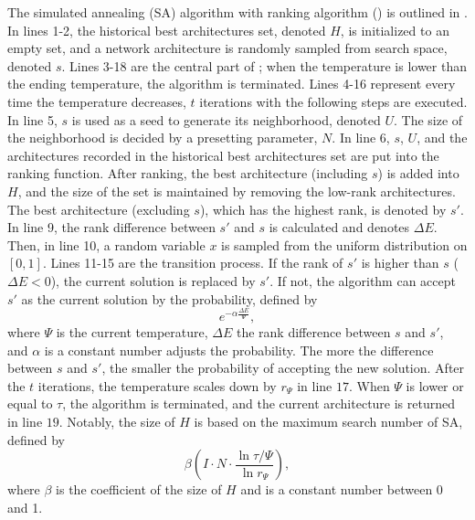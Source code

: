 \documentclass[sigconf]{acmart}
\begin{document}
    The simulated annealing (SA) algorithm with ranking algorithm (\palg{})
    is outlined in . In lines 1-2, the historical best architectures 
    set, denoted $H$, is initialized to an empty set, and a network architecture is randomly sampled from 
    search space, denoted $s$. Lines 3-18 are the central part of \palg{}; when the temperature 
    is lower than the ending temperature, the algorithm is terminated. Lines 4-16 
    represent every time the temperature decreases, $t$ iterations with the following steps are executed. 
    In line 5, $s$ is used as a seed to generate its neighborhood, denoted $U$. 
    The size of the neighborhood is decided by a presetting parameter, $N$. 
    In line 6, $s$, $U$, and the architectures recorded in the historical best architectures set are 
    put into the ranking function. 
    After ranking, the best architecture (including $s$) is added into $H$, and the size of the set is 
    maintained by removing the low-rank architectures. 
    The best architecture (excluding $s$), which has the highest rank, is denoted by $s'$. 
    In line 9, the rank difference between $s'$ and $s$ is calculated and denotes $\Delta E$. 
    Then, in line 10, a random variable $x$ is sampled from the uniform distribution on $[0,1]$. 
    Lines 11-15 are the transition process. If the rank of $s'$ is higher than $s$ ($\Delta E<0$), 
    the current solution is replaced by $s'$. If not, the algorithm can accept $s'$ as the 
    current solution by the probability, defined by 
    \begin{equation} 
        \label{equ:SA_rk_prob}
        e^{-\alpha\frac{\Delta E}{\Psi}}, 
    \end{equation}
    where $\Psi$ is the current temperature, $\Delta E$ the rank difference between 
    $s$ and $s'$, and $\alpha$ is a constant number adjusts the probability. The more 
    the difference between $s$ and $s'$, the smaller the probability of accepting the new solution. 
    After the $t$ iterations, the temperature scales down by $r_\Psi$ in line $17$. When $\Psi$ is 
    lower or equal to $\tau$, the algorithm is terminated, and the current architecture is returned in line $19$. 
    Notably, the size of $H$ is based on the maximum search number of SA, defined by 
    \begin{equation}
        \label{equ:SA_rk_size_of_H}
        \beta (I\cdot N\cdot\frac{\ln{\tau/\Psi}}{\ln{r_\Psi}}),
    \end{equation}
    where $\beta$ is the coefficient of the size of $H$ and is a constant number between 0 and 1.
\end{document}
